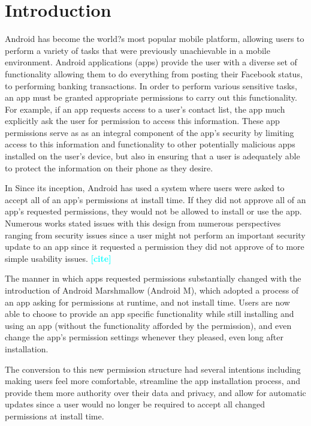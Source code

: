 \documentclass{sig-alternate-05-2015}
\newcommand{\todo}[1]{\textcolor{cyan}{\textbf{[#1]}}}
\begin{document}
\section{Introduction}
Android has become the world?s most popular mobile platform, allowing users to perform a variety of tasks that were previously unachievable in a mobile environment. Android applications (apps) provide the user with a diverse set of functionality allowing them to do everything from posting their Facebook status, to performing banking transactions. In order to perform various sensitive tasks, an app must be granted appropriate permissions to carry out this functionality. For example, if an app requests access to a user's contact list, the app much explicitly ask the user for permission to access this information. These app permissions serve as as an integral component of the app's security by limiting access to this information and functionality to other potentially malicious apps installed on the user's device, but also in ensuring that a user is adequately able to protect the information on their phone as they desire.

In Since its inception, Android has used a system where users were asked to accept all of an app's permissions at install time. If they did not approve all of an app's requested permissions, they would not be allowed to install or use the app. Numerous works stated issues with this design from numerous perspectives ranging from security issues since a user might not perform an important security update to an app since it requested a permission they did not approve of to more simple usability issues. \todo{cite} %

The manner in which apps requested permissions substantially changed with the introduction of Android Marshmallow (Android M), which adopted a process of an app asking for permissions at runtime, and not install time. Users are now able to choose to provide an app specific functionality while still installing and using an app (without the functionality afforded by the permission), and even change the app's permission settings whenever they pleased, even long after installation.


The conversion to this new permission structure had several intentions including making users feel more comfortable, streamline the app installation process, and provide them more authority over their data and privacy, and allow for automatic updates since a user would no longer be required to accept all changed permissions at install time\cite{android_developer_URL}.
\end{document}
